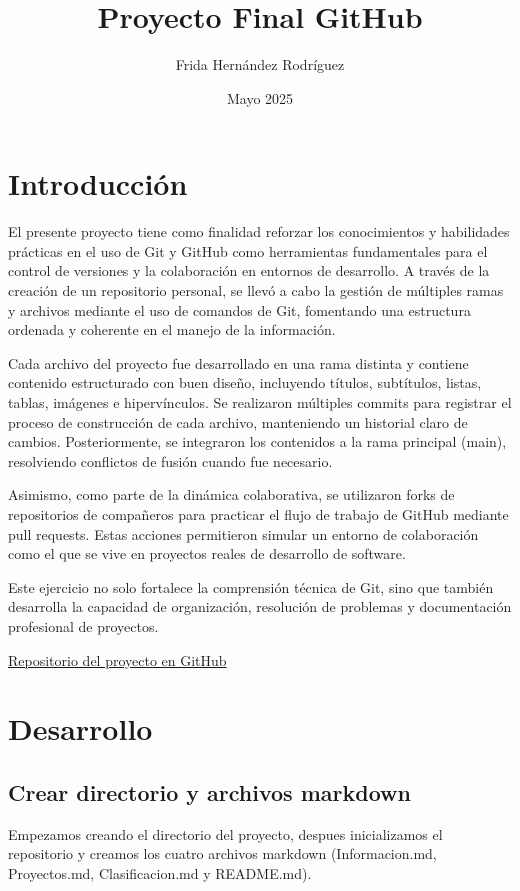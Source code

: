 \documentclass{article}
\title{Proyecto Final GitHub}
\author{Frida Hernández Rodríguez}
\date{Mayo 2025}
\begin{document}
\maketitle
\pagebreak
\tableofcontents
\pagebreak
\section{Introducción}
El presente proyecto tiene como finalidad reforzar los conocimientos y habilidades prácticas en el uso de Git y GitHub como herramientas fundamentales para el control de versiones y la colaboración en entornos de desarrollo. A través de la creación de un repositorio personal, se llevó a cabo la gestión de múltiples ramas y archivos mediante el uso de comandos de Git, fomentando una estructura ordenada y coherente en el manejo de la información.

Cada archivo del proyecto fue desarrollado en una rama distinta y contiene contenido estructurado con buen diseño, incluyendo títulos, subtítulos, listas, tablas, imágenes e hipervínculos. Se realizaron múltiples commits para registrar el proceso de construcción de cada archivo, manteniendo un historial claro de cambios. Posteriormente, se integraron los contenidos a la rama principal (main), resolviendo conflictos de fusión cuando fue necesario.

Asimismo, como parte de la dinámica colaborativa, se utilizaron forks de repositorios de compañeros para practicar el flujo de trabajo de GitHub mediante pull requests. Estas acciones permitieron simular un entorno de colaboración como el que se vive en proyectos reales de desarrollo de software.

Este ejercicio no solo fortalece la comprensión técnica de Git, sino que también desarrolla la capacidad de organización, resolución de problemas y documentación profesional de proyectos.

\href{https://github.com/Fridaaah/ProyectoFinal_GitHub_Frida_Hdz.git}{Repositorio del proyecto en GitHub}


\pagebreak
  \section{Desarrollo}
  
  \subsection{Crear directorio y archivos markdown }
Empezamos creando el directorio del proyecto, despues inicializamos el repositorio y creamos los cuatro archivos markdown (Informacion.md, Proyectos.md, Clasificacion.md y README.md).
\end{document}
